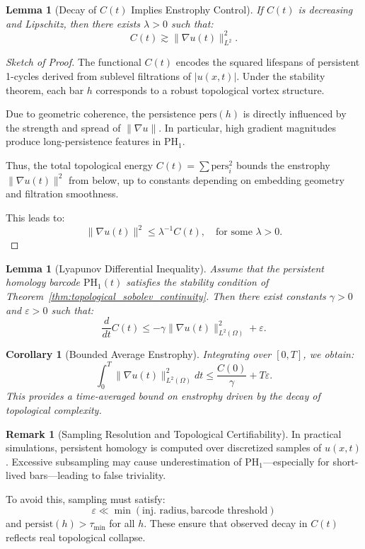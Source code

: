\documentclass[11pt]{article}
\newtheorem{lemma}[theorem]{Lemma}
\newtheorem{corollary}[theorem]{Corollary}
\theoremstyle{definition}
\newtheorem{remark}[theorem]{Remark}
\begin{document}
\begin{lemma}[Decay of $C(t)$ Implies Enstrophy Control]
If $C(t)$ is decreasing and Lipschitz, then there exists $\lambda > 0$ such that:
\[
C(t) \gtrsim \| \nabla u(t) \|_{L^2}^2.
\]
\end{lemma}

\begin{proof}[Sketch of Proof]
The functional $C(t)$ encodes the squared lifespans of persistent 1-cycles derived from sublevel filtrations of $|u(x,t)|$. Under the stability theorem, each bar $h$ corresponds to a robust topological vortex structure. 

Due to geometric coherence, the persistence $\mathrm{pers}(h)$ is directly influenced by the strength and spread of $\|\nabla u\|$. In particular, high gradient magnitudes produce long-persistence features in $\mathrm{PH}_1$.

Thus, the total topological energy $C(t) = \sum \mathrm{pers}_i^2$ bounds the enstrophy $\|\nabla u(t)\|^2$ from below, up to constants depending on embedding geometry and filtration smoothness.

This leads to:
\[
\|\nabla u(t)\|^2 \leq \lambda^{-1} C(t), \quad \text{for some } \lambda > 0.
\]
\end{proof}
        
\begin{lemma}[Lyapunov Differential Inequality]
Assume that the persistent homology barcode $\mathrm{PH}_1(t)$ satisfies the stability condition of Theorem~\ref{thm:topological_sobolev_continuity}. Then there exist constants $\gamma > 0$ and $\varepsilon > 0$ such that:
\[
\frac{d}{dt} C(t) \leq -\gamma \|\nabla u(t)\|_{L^2(\Omega)}^2 + \varepsilon.
\]
\end{lemma}

\begin{corollary}[Bounded Average Enstrophy]
Integrating over $[0,T]$, we obtain:
\[
\int_0^T \|\nabla u(t)\|_{L^2(\Omega)}^2 dt \leq \frac{C(0)}{\gamma} + T\varepsilon.
\]
This provides a time-averaged bound on enstrophy driven by the decay of topological complexity.
\end{corollary}

\begin{remark}[Sampling Resolution and Topological Certifiability]
In practical simulations, persistent homology is computed over discretized samples of $u(x,t)$. Excessive subsampling may cause underestimation of $\mathrm{PH}_1$—especially for short-lived bars—leading to false triviality.

To avoid this, sampling must satisfy:
\[ \varepsilon \ll \min(\text{inj. radius},\text{barcode threshold}) \]
and $\mathrm{persist}(h) > \tau_\text{min}$ for all $h$. These ensure that observed decay in $C(t)$ reflects real topological collapse.
\end{remark}
\end{document}
